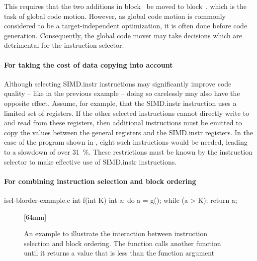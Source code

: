 This requires that the two additions in block~ be moved to
block~, which is the task of \gls{global code motion}.
%
However, as \gls{global code motion} is commonly considered to be a
target-independent optimization, it is often done before \gls{code generation}.
%
Consequently, the \gls{global code mover} may take decisions which are
detrimental for the \gls{instruction selector}.



\paragraph{For taking the cost of data copying into account}

Although selecting \gls{SIMD.instr} \glspl{instruction} may significantly
improve code quality -- like in the previous example -- doing so carelessly may
also have the opposite effect.
%
Assume, for example, that the \gls{SIMD.instr} \gls{instruction} uses a limited
set of registers.
%
If the other selected \glspl{instruction} cannot directly write to and read from
these registers, then additional \glspl{instruction} must be emitted to copy the
values between the general registers and the \gls{SIMD.instr} registers.
%
In the case of the program shown in , eight
such \glspl{instruction} would be needed, leading to a slowdown of over
\SI{31}{\percent}.
%
These restrictions must be known by the \gls{instruction selector} to make
effective use of \gls{SIMD.instr} \glspl{instruction}.



\paragraph{For combining instruction selection and block ordering}

\begin{filecontents*}{isel-blorder-example.c}
int f(int K) {
  int a;
  do {
    a = g();
  } while (a > K);
  return a;
}
\end{filecontents*}

\begin{figure}
  \centering%
                {}%
  \hspace{5mm}%
                [64mm]%
                {}%

  \caption[%
            Example illustrating the interaction between instruction selection
            and block ordering%
          ]{%
            An example to illustrate the interaction between instruction
            selection and block ordering.
            The function  calls another function  until it
            returns a value that is less than the function argument~%
          }
\end{figure}


